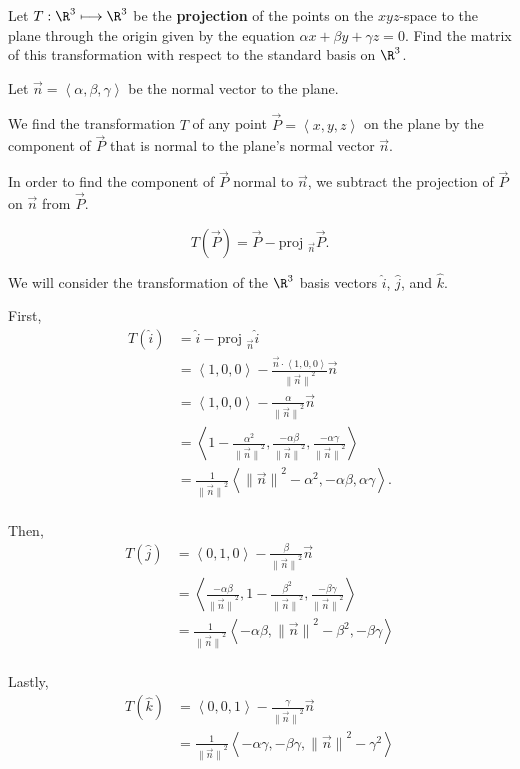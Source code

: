 \documentclass[../hw1]{subfiles}
\begin{document}
Let $T:\R ^{3 }\longmapsto\R ^{3 }$ be the \textbf{projection} of the points on the $xyz$-space to the plane through the origin given by the equation $\alpha x+\beta y + \gamma z = 0$. Find the matrix of this transformation with respect to the standard basis on $\R ^{3}$.
 
Let $\vec{n}=\left< \alpha, \beta, \gamma \right>$ be the normal vector to the plane. 

We find the transformation $T $ of any point $\vec{P}=\left<x,y,z  \right>$ on the plane by the component of $\vec{P}$ that is normal to the plane's normal vector $\vec{n}$. 

In order to find the component of $\vec{P}$ normal to $\vec{n}$, we subtract the projection of $\vec{P}$ on $\vec{n}$ from $\vec{P}$. 

\[
  T(\vec{P})=\vec{P}-\text{proj }_{\vec{n}}\vec{P}
.\] 

We will consider the transformation of the $\R ^{3 }$ basis vectors $\hat{i}$, $\hat{j}$, and $\hat{k}$.

First, \begin{align*}
  T(\hat{i})&= \hat{i}-\text{proj }_{\vec{n}} \hat{i}\\
      &= \left<1,0,0  \right>-\frac{\vec{n}\cdot\left<1,0,0  \right>}{{\|\vec{n}\|}^2}\vec{n} \\
      &= \left<1,0,0  \right>-\frac{\alpha}{{\|\vec{n}\|}^2}\vec{n} \\
      &= \left<1-\frac{\alpha ^{2 }}{{\|\vec{n}\|}^2},\frac{-\alpha\beta}{{\|\vec{n}\|}^2},\frac{-\alpha\gamma}{{\|\vec{n}\|}^2}  \right> \\
      &= \frac{1}{{\|\vec{n}\|}^2}\left<{\|\vec{n}\|}^2-\alpha ^{2 }, -\alpha\beta, \alpha\gamma \right>. \\
\end{align*}

Then, \begin{align*}
T(\hat{j})&= \left<0,1,0  \right>-\frac{\beta}{{\|\vec{n}\|}^2}\vec{n} \\  
          &= \left<\frac{-\alpha\beta}{{\|\vec{n}\|}^2},1-\frac{\beta ^{2 }}{{\|\vec{n}\|}^2},\frac{-\beta\gamma}{{\|\vec{n}\|}^2} \right> \\
          &= \frac{1}{{\|\vec{n}\|}^2}\left<-\alpha\beta,{\|\vec{n}\|}^2-\beta ^{2 },-\beta\gamma \right> \\
\end{align*}

Lastly, \begin{align*}
  T(\hat{k})&= \left<0,0,1  \right>-\frac{\gamma}{{\|\vec{n}\|}^2} \vec{n}\\
  &= \frac{1}{{\|\vec{n}\|}^2}\left<-\alpha\gamma,-\beta\gamma,{\|\vec{n}\|}^2-\gamma^{2} \right> \\
\end{align*}
\end{document}
